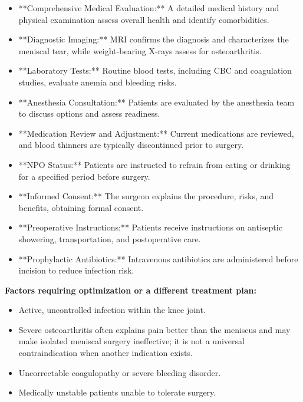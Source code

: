 \begin{itemize}
  \item **Comprehensive Medical Evaluation:** A detailed medical history and physical examination assess overall health and identify comorbidities.

  \item **Diagnostic Imaging:** MRI confirms the diagnosis and characterizes the meniscal tear, while weight-bearing X-rays assess for osteoarthritis.

  \item **Laboratory Tests:** Routine blood tests, including CBC and coagulation studies, evaluate anemia and bleeding risks.

  \item **Anesthesia Consultation:** Patients are evaluated by the anesthesia team to discuss options and assess readiness.

  \item **Medication Review and Adjustment:** Current medications are reviewed, and blood thinners are typically discontinued prior to surgery.

  \item **NPO Status:** Patients are instructed to refrain from eating or drinking for a specified period before surgery.

  \item **Informed Consent:** The surgeon explains the procedure, risks, and benefits, obtaining formal consent.

  \item **Preoperative Instructions:** Patients receive instructions on antiseptic showering, transportation, and postoperative care.

  \item **Prophylactic Antibiotics:** Intravenous antibiotics are administered before incision to reduce infection risk.
\end{itemize}

\textbf{Factors requiring optimization or a different treatment plan:}
\begin{itemize}
  \item Active, uncontrolled infection within the knee joint.
  \item Severe osteoarthritis often explains pain better than the meniscus and may make isolated meniscal surgery ineffective; it is not a universal contraindication when another indication exists.
  \item Uncorrectable coagulopathy or severe bleeding disorder.
  \item Medically unstable patients unable to tolerate surgery.
\end{itemize}


